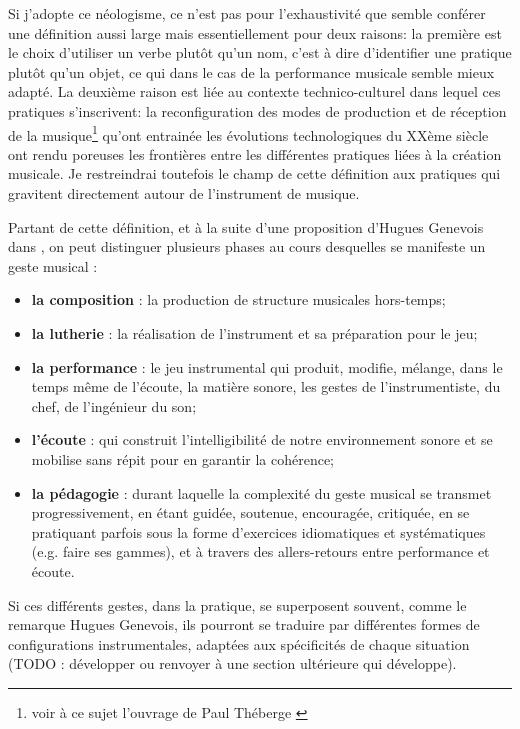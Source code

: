 Si j'adopte ce néologisme, ce n'est pas pour l'exhaustivité que semble conférer une définition aussi large mais essentiellement pour deux raisons: la première est le choix d'utiliser un verbe plutôt qu'un nom, c'est à dire d'identifier une pratique plutôt qu'un objet, ce qui dans le cas de la performance musicale semble mieux adapté. La deuxième raison est liée au contexte technico-culturel dans lequel ces pratiques s'inscrivent: la reconfiguration des modes de production et de réception de la musique\footnote{voir à ce sujet l'ouvrage de Paul Théberge \cite{theberge_any_1997}} qu'ont entrainée les évolutions technologiques du XXème siècle ont rendu poreuses les frontières entre les différentes pratiques liées à la création musicale. Je restreindrai toutefois le champ de cette définition aux pratiques qui gravitent directement autour de l'instrument de musique.

Partant de cette définition, et à la suite d'une proposition d'Hugues Genevois dans \cite{genevois_geste_1999}, on peut distinguer plusieurs phases au cours desquelles se manifeste un geste musical :

\vspace{-1em}
\begin{itemize}[noitemsep]
\item \textbf{la composition} : la production de structure musicales hors-temps;
\item \textbf{la lutherie} : la réalisation de l'instrument et sa préparation pour le jeu;
\item \textbf{la performance} : le jeu instrumental qui produit, modifie, mélange, dans le temps même de l'écoute, la matière sonore, les gestes de l'instrumentiste, du chef, de l'ingénieur du son;
\item \textbf{l'écoute} : qui construit l'intelligibilité de notre environnement sonore et se mobilise sans répit pour en garantir la cohérence;
\item \textbf{la pédagogie} : durant laquelle la complexité du geste musical se transmet progressivement, en étant guidée, soutenue, encouragée, critiquée, en se pratiquant parfois sous la forme d'exercices idiomatiques et systématiques (e.g. faire ses gammes), et à travers des allers-retours entre performance et écoute.
\end{itemize}

Si ces différents gestes, dans la pratique, se superposent souvent, comme le remarque Hugues Genevois, ils pourront se traduire par différentes formes de configurations instrumentales, adaptées aux spécificités de chaque situation (TODO : développer ou renvoyer à une section ultérieure qui développe).


